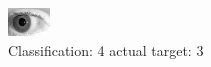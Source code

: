 \begin{figure}[h!]
\begin{center}
\includegraphics[width=0.60\columnwidth]{figures/ID272_class_4_target_3.png}
\end{center}
\caption{ Classification: 4 actual target: 3}
\label{fig:ID272_class_4_target_3}
\end{figure}
